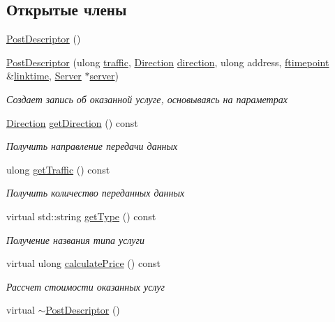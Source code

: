 \subsection*{Открытые члены}
\begin{DoxyCompactItemize}
\item 
\hyperlink{class_network_service_1_1_post_descriptor_a7c6bd39a757d05812d5ee8f3faea133a}{Post\+Descriptor} ()
\item 
\hyperlink{class_network_service_1_1_post_descriptor_ac888b36a88d706220479595328e8f2cb}{Post\+Descriptor} (ulong \hyperlink{class_network_service_1_1_post_descriptor_ae2eef559828a42ec299ab59711f88e59}{traffic}, \hyperlink{namespace_network_service_abe1196dad9e8afcbc5c6b38196ce2c65}{Direction} \hyperlink{class_network_service_1_1_post_descriptor_a04faf66e747b2d4f2d89bf1e92f4ab5c}{direction}, ulong address, \hyperlink{networkservice_8h_ac877dfabb0f4f6a8184aa821b447e81d}{ftimepoint} \&\hyperlink{class_network_service_1_1_service_descriptor_a08bfd17afce0cba1954d30bd76a14df4}{linktime}, \hyperlink{class_network_service_1_1_server}{Server} $\ast$\hyperlink{class_network_service_1_1_service_descriptor_ad504b32ced44a75e0e02ea961d9434c4}{server})
\begin{DoxyCompactList}\small\item\em Создает запись об оказанной услуге, основываясь на параметрах \end{DoxyCompactList}\item 
\hyperlink{namespace_network_service_abe1196dad9e8afcbc5c6b38196ce2c65}{Direction} \hyperlink{class_network_service_1_1_post_descriptor_a09d005d77c03866e7875f4df0dcffad2}{get\+Direction} () const 
\begin{DoxyCompactList}\small\item\em Получить направление передачи данных \end{DoxyCompactList}\item 
ulong \hyperlink{class_network_service_1_1_post_descriptor_a3b859050d7ca47084a751b2be4da192c}{get\+Traffic} () const 
\begin{DoxyCompactList}\small\item\em Получить количество переданных данных \end{DoxyCompactList}\item 
virtual std\+::string \hyperlink{class_network_service_1_1_post_descriptor_a91b6330d604d4866c85c32187f131431}{get\+Type} () const 
\begin{DoxyCompactList}\small\item\em Получение названия типа услуги \end{DoxyCompactList}\item 
virtual ulong \hyperlink{class_network_service_1_1_post_descriptor_ae88dfdc2d12299b6d3b14786d16e3251}{calculate\+Price} () const 
\begin{DoxyCompactList}\small\item\em Рассчет стоимости оказанных услуг \end{DoxyCompactList}\item 
virtual \hyperlink{class_network_service_1_1_post_descriptor_a4b6701e1d070e3d0425840d6597bc505}{$\sim$\+Post\+Descriptor} ()
\end{DoxyCompactItemize}
